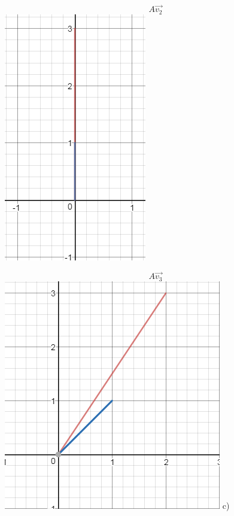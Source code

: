 \documentclass[12pt]{article}
\newenvironment{problem}[2][Problem]{\begin{trivlist}
\item[\hskip \labelsep {\bfseries #1}\hskip \labelsep {\bfseries #2.}]}{\end{trivlist}}
\begin{document}
\begin{problem}{10}
\[A\vec{v_2} \]
\includegraphics{Av2}

\[A\vec{v_3} \]
\includegraphics{Av3}
c)\\

\end{problem}
\end{document}
